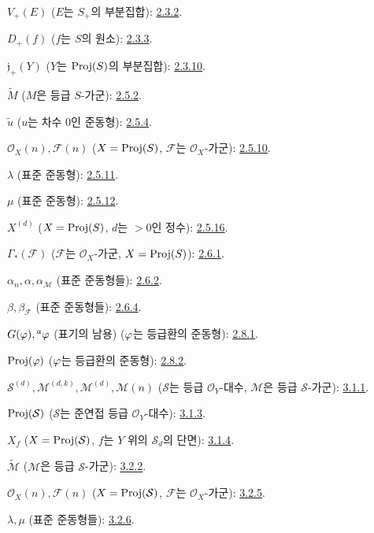 $V_+(E)$ ($E$는 $S_+$의 부분집합): \hyperref[II.2.3.2-ko]{2.3.2}.

$D_+(f)$ ($f$는 $S$의 원소): \hyperref[II.2.3.3-ko]{2.3.3}.

$\mathfrak j_+(Y)$ ($Y$는 $\operatorname{Proj}(S)$의 부분집합): \hyperref[II.2.3.10-ko]{2.3.10}.

$\widetilde M$ ($M$은 등급 $S$-가군): \hyperref[II.2.5.2-ko]{2.5.2}.

$\widetilde u$ ($u$는 차수 $0$인 준동형): \hyperref[II.2.5.4-ko]{2.5.4}.

$\mathcal{O}_X(n),\mathcal{F}(n)$
($X=\operatorname{Proj}(S)$, $\mathcal{F}$는 $\mathcal{O}_X$-가군): \hyperref[II.2.5.10-ko]{2.5.10}.

$\lambda$ (표준 준동형): \hyperref[II.2.5.11-ko]{2.5.11}.

$\mu$ (표준 준동형): \hyperref[II.2.5.12-ko]{2.5.12}.

$X^{(d)}$ ($X=\operatorname{Proj}(S)$, $d$는 $>0$인 정수): \hyperref[II.2.5.16-ko]{2.5.16}.

$\Gamma_*(\mathcal{F})$ ($\mathcal{F}$는 $\mathcal{O}_X$-가군,
$X=\operatorname{Proj}(S)$): \hyperref[II.2.6.1-ko]{2.6.1}.

$\alpha_n,\alpha,\alpha_{\mathcal{M}}$ (표준 준동형들): \hyperref[II.2.6.2-ko]{2.6.2}.

$\beta,\beta_{\mathcal{F}}$ (표준 준동형들): \hyperref[II.2.6.4-ko]{2.6.4}.

$G(\varphi),{}^a\varphi$ (표기의 남용)
($\varphi$는 등급환의 준동형): \hyperref[II.2.8.1-ko]{2.8.1}.

$\operatorname{Proj}(\varphi)$ ($\varphi$는 등급환의 준동형): \hyperref[II.2.8.2-ko]{2.8.2}.

$\mathcal{S}^{(d)},\mathcal{M}^{(d,k)},\mathcal{M}^{(d)},\mathcal{M}(n)$
($\mathcal{S}$는 등급 $\mathcal{O}_Y$-대수,
$\mathcal{M}$은 등급 $\mathcal{S}$-가군): \hyperref[II.3.1.1-ko]{3.1.1}.

$\operatorname{Proj}(\mathcal{S})$ ($\mathcal{S}$는 준연접 등급 $\mathcal{O}_Y$-대수): \hyperref[II.3.1.3-ko]{3.1.3}.

$X_f$ ($X=\operatorname{Proj}(\mathcal{S})$, $f$는 $Y$ 위의 $\mathcal{S}_d$의 단면): \hyperref[II.3.1.4-ko]{3.1.4}.

$\widetilde{\mathcal{M}}$ ($\mathcal{M}$은 등급 $\mathcal{S}$-가군): \hyperref[II.3.2.2-ko]{3.2.2}.

$\mathcal{O}_X(n),\mathcal{F}(n)$
($X=\operatorname{Proj}(\mathcal{S})$, $\mathcal{F}$는 $\mathcal{O}_X$-가군): \hyperref[II.3.2.5-ko]{3.2.5}.

$\lambda,\mu$ (표준 준동형들): \hyperref[II.3.2.6-ko]{3.2.6}.

